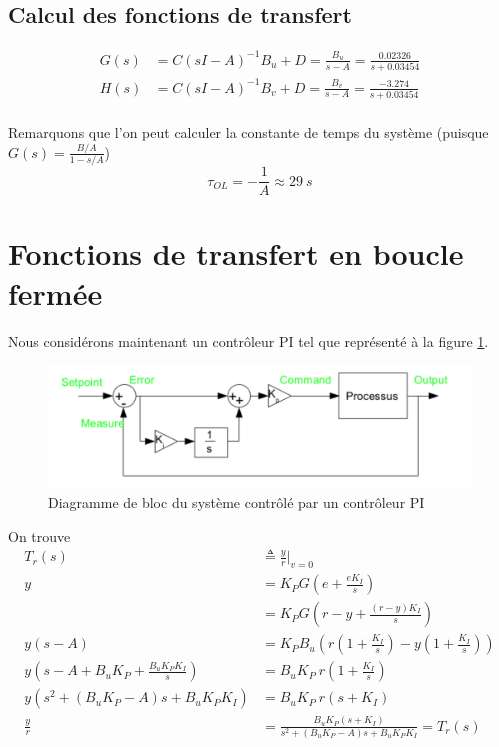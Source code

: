 \documentclass[frenchb, paper=a4, fontsize=11pt]{scrartcl}
\numberwithin{equation}{section}					%
\numberwithin{figure}{section}					%
\numberwithin{table}{section}						%
\begin{document}
\subsection{Calcul des fonctions de transfert}
\begin{align}
G(s) &= C(sI-A)^{-1}B_u + D = \frac{B_u}{s-A}= \frac{0.02326}{s+0.03454}\\
H(s) &= C(sI-A)^{-1}B_v + D = \frac{B_v}{s-A} = \frac{-3.274}{s+0.03454}\\
\end{align}

Remarquons que l'on peut calculer la constante de temps du système (puisque $G(s) = \frac{B/A}{1-s/A}$)
\begin{equation}
\tau_{OL} = -\frac{1}{A} \approx \SI{29}{s}
\end{equation}

\section{Fonctions de transfert en boucle fermée}

Nous considérons maintenant un contrôleur PI tel que représenté à la figure \ref{fig:closed_loop}.

\begin{figure}[!ht]
	\centering
	\includegraphics[width=\linewidth]{img/closed_loop.png}
	\caption{Diagramme de bloc du système contrôlé par un contrôleur PI}
	\label{fig:closed_loop}
\end{figure}


On trouve
\begin{align}
T_r(s) & \triangleq \frac{y}{r}\rvert_{v=0}\\
y &= K_P G \left(e+\frac{eK_I}{s} \right)\\
& = K_P G\left(r-y+\frac{(r-y)K_I}{s} \right)\\
y(s-A) & = K_P B_u\left( r(1+\frac{K_I}{s}) - y(1+\frac{K_I}{s})\right)\\
y(s-A + B_uK_P + \frac{B_uK_P K_I}{s}) & = B_uK_P  \ r \left(1+\frac{K_I}{s} \right) \\
y(s^2 +(B_uK_P-A)s + B_uK_P K_I) & = B_uK_P  \ r \left(s+K_I \right) \\
\frac{y}{r}&= \frac{B_uK_P  (s+K_I )}{s^2 +(B_uK_P-A)s + B_u K_P K_I} = T_r(s)
\end{align}
\end{document}
